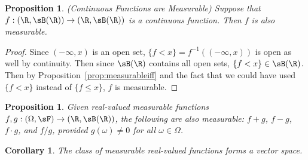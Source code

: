 \documentclass[12pt]{article}
\theoremstyle{plain}
\newtheorem{prop}[thm]{Proposition}
\newtheorem{cor}[thm]{Corollary}
\theoremstyle{definition}
\theoremstyle{remark}
\newcommand{\ra}{\rightarrow}
\begin{document}
\begin{prop}\emph{(Continuous Functions are Measurable)}
\label{prop:meascont}
Suppose that $f:(\R,\sB(\R))\ra(\R,\sB(\R))$ is a continuous function.
Then $f$ is also measurable.
\end{prop}
\begin{proof}
Since $(-\infty,x)$ is an open set, $\{f<x\}=f^{-1}((-\infty,x))$ is
open as well by continuity. Then since $\sB(\R)$ contains all open sets,
$\{f<x\}\in\sB(\R)$.
Then by Proposition~\ref{prop:measurableiff} and the fact that we could
have used $\{f<x\}$ instead of $\{f\leq x\}$, $f$ is measurable.
\end{proof}

\begin{prop}
\label{prop:measadd}
Given real-valued measurable functions
$f,g:(\Omega,\sF)\ra(\R,\sB(\R))$,
the following are also measurable:
$f+g$, $f-g$, $f\cdot g$, and  $f/g$, provided $g(\omega)\neq 0$ for all
$\omega\in\Omega$.
\end{prop}

\begin{cor}
The class of measurable real-valued functions forms a vector space.
\end{cor}
\end{document}
